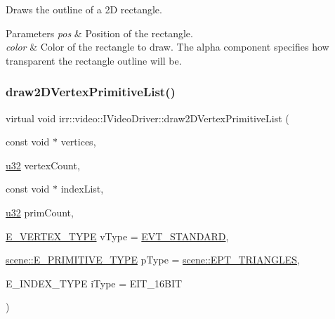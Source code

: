Draws the outline of a 2D rectangle. 


\begin{DoxyParams}{Parameters}
{\em pos} & Position of the rectangle. \\
\hline
{\em color} & Color of the rectangle to draw. The alpha component specifies how transparent the rectangle outline will be. \\
\hline
\end{DoxyParams}
\mbox{\label{classirr_1_1video_1_1IVideoDriver_a34845920167c68578a78f842af54d140}} 
\subsubsection{\texorpdfstring{draw2\+D\+Vertex\+Primitive\+List()}{draw2DVertexPrimitiveList()}\hspace{0.1cm}{\footnotesize\ttfamily [1/2]}}
{\footnotesize\ttfamily virtual void irr\+::video\+::\+I\+Video\+Driver\+::draw2\+D\+Vertex\+Primitive\+List (\begin{DoxyParamCaption}\item[{const void $\ast$}]{vertices,  }\item[{\hyperlink{namespaceirr_a0416a53257075833e7002efd0a18e804}{u32}}]{vertex\+Count,  }\item[{const void $\ast$}]{index\+List,  }\item[{\hyperlink{namespaceirr_a0416a53257075833e7002efd0a18e804}{u32}}]{prim\+Count,  }\item[{\hyperlink{namespaceirr_1_1video_a0e3b59e025e0d0db0ed2ee0ce904deac}{E\+\_\+\+V\+E\+R\+T\+E\+X\+\_\+\+T\+Y\+PE}}]{v\+Type = {\ttfamily \hyperlink{namespaceirr_1_1video_a0e3b59e025e0d0db0ed2ee0ce904deaca921f287a4f48d612a5be2d89453ca262}{E\+V\+T\+\_\+\+S\+T\+A\+N\+D\+A\+RD}},  }\item[{\hyperlink{namespaceirr_1_1scene_a5d7de82f2169761194b2f44d95cdc1dc}{scene\+::\+E\+\_\+\+P\+R\+I\+M\+I\+T\+I\+V\+E\+\_\+\+T\+Y\+PE}}]{p\+Type = {\ttfamily \hyperlink{namespaceirr_1_1scene_a5d7de82f2169761194b2f44d95cdc1dca6c884c4de3210b3ed36c99fb828ce376}{scene\+::\+E\+P\+T\+\_\+\+T\+R\+I\+A\+N\+G\+L\+ES}},  }\item[{E\+\_\+\+I\+N\+D\+E\+X\+\_\+\+T\+Y\+PE}]{i\+Type = {\ttfamily EIT\+\_\+16BIT} }\end{DoxyParamCaption})\hspace{0.3cm}{\ttfamily [pure virtual]}}



